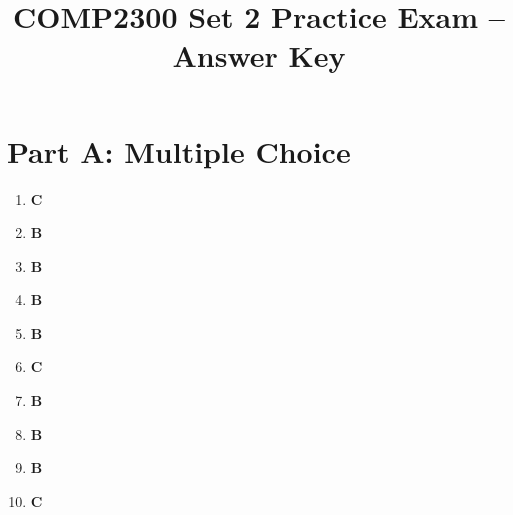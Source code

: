 \documentclass[11pt]{article}
\title{COMP2300 Set 2 Practice Exam -- Answer Key}
\author{}
\date{}
\begin{document}
\maketitle

\section*{Part A: Multiple Choice}
\begin{enumerate}[label=\textbf{A\arabic*.}]
  \item \textbf{C}
  \item \textbf{B}
  \item \textbf{B}
  \item \textbf{B}
  \item \textbf{B}
  \item \textbf{C}
  \item \textbf{B}
  \item \textbf{B}
  \item \textbf{B}
  \item \textbf{C}
\end{enumerate}
\end{document}
